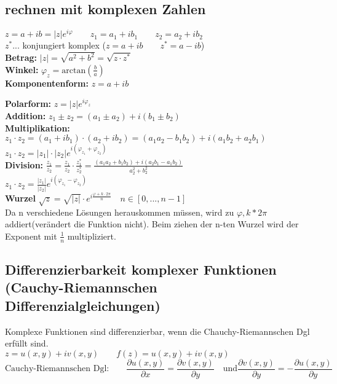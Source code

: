 \subsection{rechnen mit komplexen Zahlen}
$z = a +ib = |z|e^{i \varphi} \qquad z_1 = a_1+ib_1 \qquad z_2 = a_2+ib_2$\\
$z^*$... konjungiert komplex ($z=a+ib \qquad z^*=a-ib$)\\

\textbf{Betrag:} $|z| = \sqrt{a^2+b^2} = \sqrt{z\cdot z^*}$\\
\textbf{Winkel:} $\varphi _z = \text{arctan}(\frac{b}{a})$\\

\textbf{Komponentenform:} $z=a+ib$

\textbf{Polarform:} $z = |z|e^{i\varphi _z}$\\

\textbf{Addition:} $z_1 \pm z_2 = (a_1 \pm a_2) + i(b_1 \pm b_2)$\\

\textbf{Multiplikation:} $z_1 \cdot z_2 = (a_1 + ib_1) \cdot (a_2 + ib_2) = (a_1a_2 - b_1b_2) + i(a_1b_2 + a_2b_1)$\\
$z_1\cdot z_2 = |z_1|\cdot |z_2|e^{i(\varphi _{z_1} +\varphi _{z_2})}$\\


\textbf{Division:} $\frac{z_1}{z_2}=\frac{z_1}{z_2} \cdot \frac{z_1^*}{z_2^*} = \frac{(a_1a_2+b_1b_2)+i(a_2b_1-a_1b_2)}{a_2^2+b_2^2}$\\
$z_1 \cdot z_2 = \frac{|z_1|}{|z_2|}e^{i(\varphi _{z_1} -\varphi _{z_2})}$\\

\textbf{Wurzel} $\sqrt{z} = \sqrt{|z|}\cdot e^{i \frac{\varphi +k\cdot 2\pi}{n}} \quad n \in [0,...,n-1]$\\
Da n verschiedene Lösungen herauskommen müssen, wird zu $\varphi, k*2\pi$ addiert(verändert die Funktion nicht). Beim ziehen der n-ten Wurzel wird der Exponent mit $\frac{1}{n}$ multipliziert.

\subsection{Differenzierbarkeit komplexer Funktionen (Cauchy-Riemannschen Differenzialgleichungen)}

Komplexe Funktionen sind differenzierbar, wenn die Chauchy-Riemannschen Dgl erfüllt sind.\\

$z=u(x,y) + iv(x,y)\qquad f(z) = u(x,y) + iv(x,y)$\\

\[\text{Cauchy-Riemannschen Dgl:}\qquad \frac{\partial u(x,y)}{\partial x} = \frac{\partial v(x,y)}{\partial y} \quad \text{und} \frac{\partial v(x,y)}{\partial y} = - \frac{\partial u(x,y)}{\partial y} \]